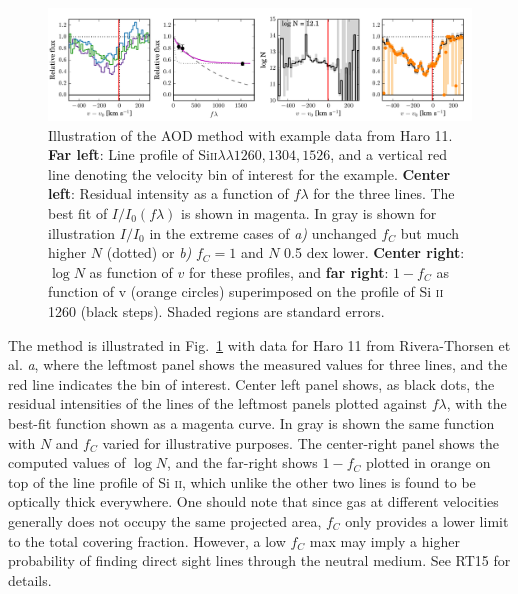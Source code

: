 \documentclass[10pt, letterpaper, headings=Large, DIV=14]{scrartcl}
\begin{document}
\begin{figure}[h] %
   \centering
   \includegraphics[width=\textwidth]{./AOD-details-example-4pane.pdf} 
   \caption{Illustration of the AOD method with example data from Haro 11.
   \textbf{Far left}: Line profile of Si\textsc{ii}\(\lambda\lambda 1260, 1304,
   1526\), and a vertical red line denoting the velocity bin of interest for the
   example. \textbf{Center left}: Residual intensity as a function of
   \(f\lambda\) for the three lines. The best fit of \(I/I_0(f\lambda)\) is 
   shown in magenta. In gray is shown for illustration \(I/I_0\) in the extreme
   cases of \emph{a)} unchanged $f_C$ but much higher $N$ (dotted) or \emph{b)}
   $f_C=1$ and $N$ 0.5 dex lower. \textbf{Center right}: $\log N$ as function of
   $v$ for these profiles, and \textbf{far right}: $1-f_C$ as function of v
   (orange circles) superimposed on the profile of Si \textsc{ii} 1260 (black
	   steps). Shaded regions are standard errors. }
   \label{fig:AOD}
\end{figure}

The method is illustrated in Fig.~\ref{fig:AOD} with data for Haro 11 from
Rivera-Thorsen et al. \emph{a}, where the leftmost panel shows the measured
values for three lines, and the red line indicates the bin of interest. Center
left panel shows, as black dots, the residual intensities of the lines of the
leftmost panels plotted against $f\lambda$, with the best-fit function shown as
a magenta curve. In gray is shown the same function with $N$ and $f_C$ varied
for illustrative purposes. The center-right panel shows the computed values of
$\log N$, and the far-right shows $1-f_C$ plotted in orange on top of the line
profile of Si \textsc{ii}, which unlike the other two lines is found to be
optically thick everywhere. One should note that since gas at different
velocities generally does not occupy the same projected area, $f_C$  only
provides a lower limit to the total covering fraction. However, a low $f_C$ max
may imply a higher probability of finding direct sight lines through the neutral
medium.  See RT15 for details. 
\end{document}
